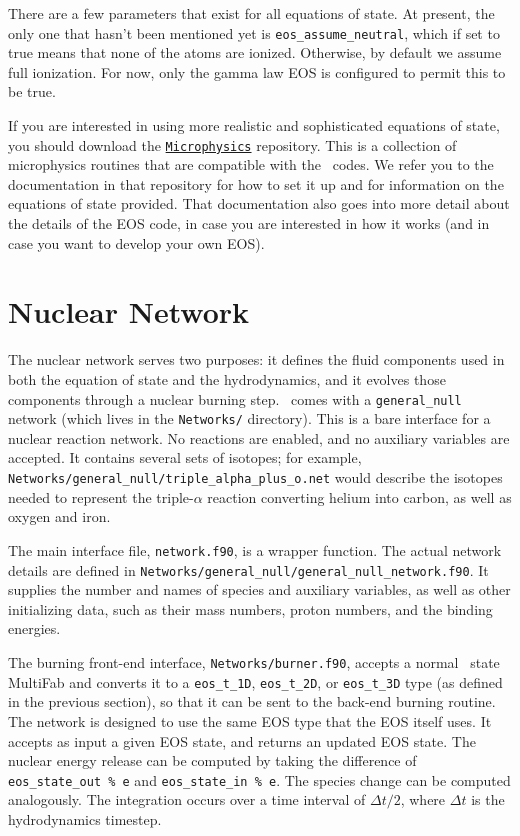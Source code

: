 There are a few parameters that exist for all equations of state.
At present, the only one that hasn't been mentioned yet is
\texttt{eos\_assume\_neutral}, which if set to true means that
none of the atoms are ionized. Otherwise, by default we assume
full ionization. For now, only the gamma law EOS is configured
to permit this to be true.

If you are interested in using more realistic and sophisticated equations of
state, you should download the \href{https://github.com/BoxLib-Codes/Microphysics}{\tt Microphysics}
repository. This is a collection of microphysics routines that are compatible with the
\boxlib\ codes. We refer you to the documentation in that repository for how to set it up
and for information on the equations of state provided. That documentation
also goes into more detail about the details of the EOS code, in case you are interested in
how it works (and in case you want to develop your own EOS).

\section{Nuclear Network}

The nuclear network serves two purposes: it defines the fluid components used
in both the equation of state and the hydrodynamics, and it evolves those
components through a nuclear burning step. \castro\ comes with a {\tt general\_null}
network (which lives in the {\tt Networks/} directory). This is a bare interface for a
nuclear reaction network. No reactions are enabled, and no auxiliary variables
are accepted. It contains several sets of isotopes; for example,
{\tt Networks/general\_null/triple\_alpha\_plus\_o.net} would describe the
isotopes needed to represent the triple-$\alpha$ reaction converting
helium into carbon, as well as oxygen and iron.

The main interface file, {\tt network.f90}, is a wrapper function. The
actual network details are defined in {\tt Networks/general\_null/general\_null\_network.f90}.
It supplies the number and names of species and auxiliary variables, as
well as other initializing data, such as their mass numbers, proton numbers, and the binding
energies.

The burning front-end interface, {\tt Networks/burner.f90}, accepts a normal
\castro\ state MultiFab and converts it to a
{\tt eos\_t\_1D}, {\tt eos\_t\_2D}, or {\tt eos\_t\_3D} type (as defined
in the previous section), so that it can be sent to the back-end burning routine.
The network is designed to use the same EOS type that the EOS itself uses. It
accepts as input a given EOS state, and returns an updated EOS state. The
nuclear energy release can be computed by taking the difference of
{\tt eos\_state\_out \% e} and {\tt eos\_state\_in \% e}. The species
change can be computed analogously. The integration occurs over a
time interval of $\Delta t/2$, where $\Delta t$ is the hydrodynamics timestep.

